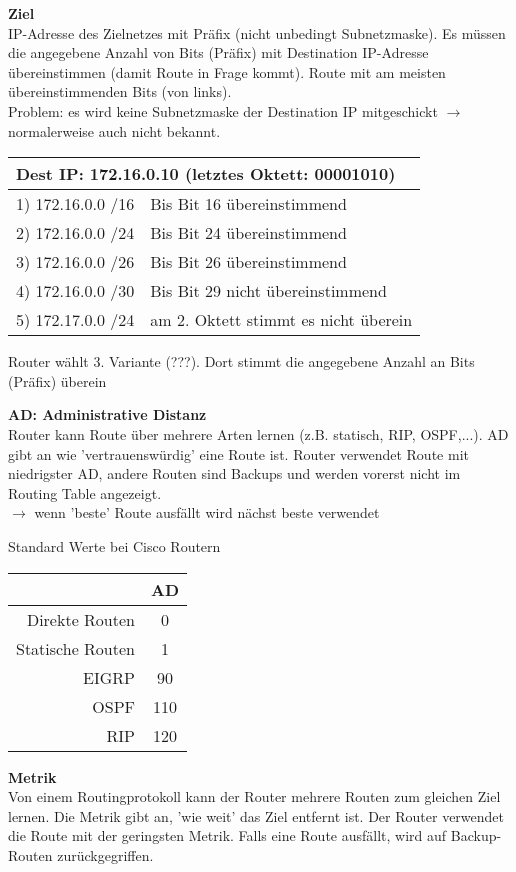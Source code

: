 \textbf{Ziel} \\
IP-Adresse des Zielnetzes mit Präfix (nicht unbedingt Subnetzmaske). Es müssen die angegebene Anzahl von Bits (Präfix) mit Destination IP-Adresse übereinstimmen (damit Route in Frage kommt). Route mit am meisten übereinstimmenden Bits (von links). \\
Problem: es wird keine Subnetzmaske der Destination IP mitgeschickt $\rightarrow$ normalerweise auch nicht bekannt.
\begin{table}[H]
	\begin{tabular}{ll}
		\multicolumn{2}{l}{Dest IP: 172.16.0.10 (letztes Oktett: 00001010)} \\
		\hline
		1) 172.16.0.0 /16 & Bis Bit 16 übereinstimmend \\
		2) 172.16.0.0 /24 & Bis Bit 24 übereinstimmend \\
		3) 172.16.0.0 /26 & Bis Bit 26 übereinstimmend \\
		4) 172.16.0.0 /30 & Bis Bit 29 nicht übereinstimmend \\
		5) 172.17.0.0 /24 & am 2. Oktett stimmt es nicht überein
	\end{tabular}
\end{table}
Router wählt 3. Variante (???). Dort stimmt die angegebene Anzahl an Bits (Präfix) überein

\textbf{AD: Administrative Distanz} \\
Router kann Route über mehrere Arten lernen (z.B. statisch, RIP, OSPF,...). AD gibt an wie 'vertrauenswürdig' eine Route ist. Router verwendet Route mit niedrigster AD, andere Routen sind Backups und werden vorerst nicht im Routing Table angezeigt.\\
$\rightarrow$ wenn 'beste' Route ausfällt wird nächst beste verwendet

Standard Werte bei Cisco Routern
\begin{table}[H]
	\begin{tabular}{rc}
		& AD \\
		\hline
		Direkte Routen & 0 \\
		Statische Routen & 1 \\
		EIGRP & 90 \\
		OSPF & 110 \\
		RIP & 120 \\
	\end{tabular}
\end{table}

\textbf{Metrik} \\
Von einem Routingprotokoll kann der Router mehrere Routen zum gleichen Ziel lernen. Die Metrik gibt an, 'wie weit' das Ziel entfernt ist. Der Router verwendet die Route mit der geringsten Metrik. Falls eine Route ausfällt, wird auf Backup-Routen zurückgegriffen.

